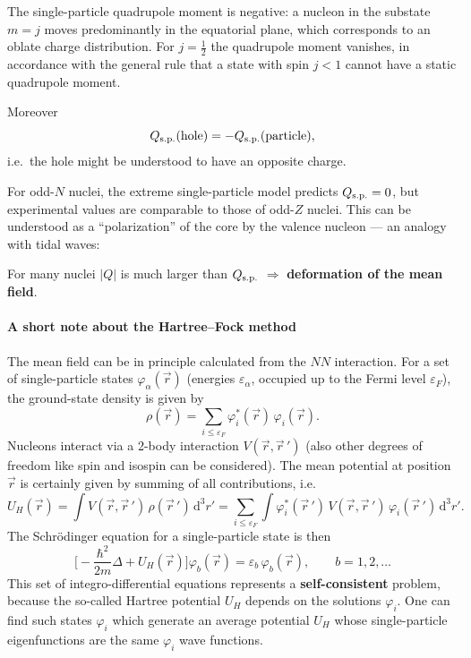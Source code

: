 \documentclass[11pt,a4paper]{article}
\newcommand{\ud}{\mathrm{d}}
\begin{document}
The single-particle quadrupole moment is negative: a nucleon in the substate $m=j$ moves predominantly in the equatorial plane, which corresponds to an oblate charge distribution. For $j=\frac12$ the quadrupole moment vanishes, in accordance with the general rule that a state with spin $j<1$ cannot have a static quadrupole moment.

Moreover
\[
Q_{\rm s.p.}(\text{hole})=-Q_{\rm s.p.}(\text{particle}),
\]
i.e.\ the hole might be understood to have an opposite charge.

For odd-$N$ nuclei, the extreme single-particle model predicts $Q_{\rm s.p.}=0$, but experimental values are comparable to those of odd-$Z$ nuclei. This can be understood as a ``polarization'' of the core by the valence nucleon --- an analogy with tidal waves:
\begin{center}
\end{center}
For many nuclei $|Q|$ is much larger than $Q_{\rm s.p.}$ $\Rightarrow$ \textbf{deformation of the mean field}.

\paragraph{A short note about the Hartree--Fock method}

\label{sec:HF}

The mean field can be in principle calculated from the $NN$ interaction. For a set of single-particle states $\varphi_\alpha(\vec r)$ (energies $\varepsilon_\alpha$, occupied up to the Fermi level $\varepsilon_F$), the ground-state density is given by
\[
\rho(\vec r)=\sum_{i\le\varepsilon_F}\varphi_i^*(\vec r)\,\varphi_i(\vec r).
\]
Nucleons interact via a 2-body interaction $V(\vec r,\vec r\,')$ (also other degrees of freedom like spin and isospin can be considered). The mean potential at position $\vec r$ is certainly given by summing of all contributions, i.e.
\[
U_H(\vec r)=\int V(\vec r,\vec r\,')\,\rho(\vec r\,')\,\ud^3r'
=\sum_{i\le\varepsilon_F}\int\varphi_i^*(\vec r\,')\,V(\vec r,\vec r\,')\,\varphi_i(\vec r\,')\,\ud^3r' .
\]
The Schr\"odinger equation for a single-particle state is then
\[
\Big[-\frac{\hbar^2}{2m}\Delta+U_H(\vec r)\Big]\varphi_b(\vec r)=\varepsilon_b\,\varphi_b(\vec r),\qquad b=1,2,\dots
\]
This set of integro-differential equations represents a \textbf{self-consistent} problem, because the so-called Hartree potential $U_H$ depends on the solutions $\varphi_i$. One can find such states $\varphi_i$ which generate an average potential $U_H$ whose single-particle eigenfunctions are the same $\varphi_i$ wave functions.
\end{document}

